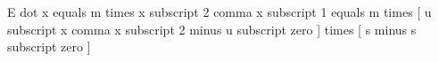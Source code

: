 E dot x equals m times x subscript 2 comma x subscript 1 equals m times [ u subscript x comma x subscript 2 minus u subscript zero ] times [ s minus s subscript zero ]